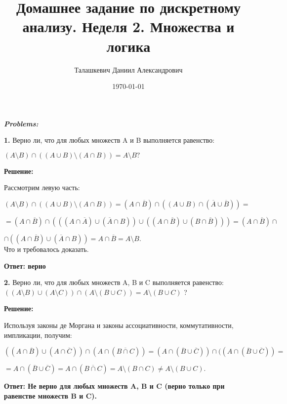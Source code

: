 \documentclass[a4paper,12pt]{article} %
\author{Талашкевич Даниил Александрович}
\title{Домашнее задание по дискретному анализу. Неделя 2. Множества и логика}
\date{\today}
\begin{document}
\maketitle
\thispagestyle{empty}

\newpage
\setcounter{page}{1}
\begin{center}
\itshape
\bfseries
{ \Large Problems:}
\end{center}
{\bf 1.} Верно ли, что для любых множеств A и B выполняется равенство:

$(A\setminus B)\cap ((A\cup B)\setminus (A\cap B)) = A\setminus B ? $
\begin{center}
\bfseries
{\Large Решение: }
\end{center}
Рассмотрим левую часть: 

$(A\setminus B)\cap ((A\cup B)\setminus (A\cap B))  = (A\cap \overline{B})\cap ((A\cup {B}) \cap (\overline{A} \cup \overline{B})) =$

$ = (A\cap \overline{B}) \cap (((A \cap \overline{A}) \cup (\overline{A}\cap B)) \cup ((A \cap \overline{B}) \cup (B \cap \overline{B}))) = (A \cap \overline{B}) \cap$

$\cap ((A \cap \overline{B}) \cup (\overline{A}\cap B)) = A \cap \overline{B} = A\setminus B.$\\
Что и требовалось доказать.

\begin{flushright}
\begin{large}
\textbf {Ответ: верно}
\end{large}
\end{flushright}

{\bf 2.} Верно ли, что для любых множеств A, B и C выполняется равенство: $((A \setminus B) \cup (A \setminus C)) \cap (A \setminus (B \cup C)) = A \setminus (B \cup C) $ ?

\begin{center}
\bfseries
{\Large Решение: }
\end{center}
Используя законы де Моргана и законы ассоциативности, коммутативности, импликации, получим:

$((A \cap \overline{B} )\cup (A \cap \overline{C})) \cap (A \cap ( \overline{B \cap C} )) = (A \cap (\overline{B} \cup \overline{C})) \cap (( A \cap (\overline{B} \cup \overline{C})) =$

$= A \cap ( \overline{B} \cup \overline{C}) = A \cap (\overline{B \cap C}) = A \setminus ( B \cap C) \neq A\setminus (B \cup C).$ 
\begin{flushright}
\begin{large}
\textbf {Ответ: Не верно для любых множеств A, B и C (верно только при равенстве множеств B и C).}
\end{large}
\end{flushright}
\end{document}
